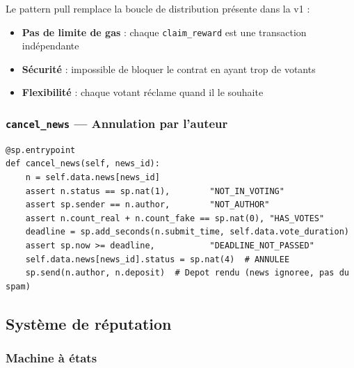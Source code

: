 \documentclass[12pt,a4paper]{article}
\newenvironment{infobox}[1][Info]{%
  \begin{tcolorbox}[
    enhanced, breakable,
    colback=accent!8, colframe=accent!70, coltitle=white,
    title=\textbf{#1}, fonttitle=\small,
    arc=4pt, boxrule=0.8pt,
    left=6pt, right=6pt, top=5pt, bottom=5pt
  ]
}{\end{tcolorbox}}
\newcommand{\entrypoint}[1]{\textcolor{primary}{\texttt{\textbf{#1}}}}
\begin{document}
\begin{infobox}[Avantages du pattern pull-over-push]
Le pattern pull remplace la boucle de distribution présente dans la v1 :
\begin{itemize}
  \item \textbf{Pas de limite de gas} : chaque \texttt{claim\_reward} est une transaction indépendante
  \item \textbf{Sécurité} : impossible de bloquer le contrat en ayant trop de votants
  \item \textbf{Flexibilité} : chaque votant réclame quand il le souhaite
\end{itemize}
\end{infobox}

\subsubsection{\entrypoint{cancel\_news} — Annulation par l'auteur}

\begin{lstlisting}[language=SmartPy, caption={Entrypoint cancel\_news}]
@sp.entrypoint
def cancel_news(self, news_id):
    n = self.data.news[news_id]
    assert n.status == sp.nat(1),        "NOT_IN_VOTING"
    assert sp.sender == n.author,        "NOT_AUTHOR"
    assert n.count_real + n.count_fake == sp.nat(0), "HAS_VOTES"
    deadline = sp.add_seconds(n.submit_time, self.data.vote_duration)
    assert sp.now >= deadline,           "DEADLINE_NOT_PASSED"
    self.data.news[news_id].status = sp.nat(4)  # ANNULEE
    sp.send(n.author, n.deposit)  # Depot rendu (news ignoree, pas du spam)
\end{lstlisting}

\subsection{Système de réputation}

\subsubsection{Machine à états}
\end{document}
